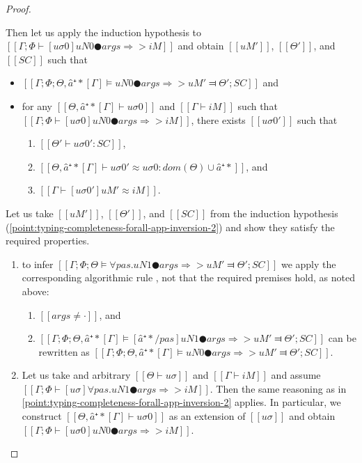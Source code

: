 \begin{proof}
\begin{caseof}
\begin{enumerate}
\begin{enumerate}
                            Then let us apply the induction hypothesis
                            to $[[Γ; Φ ⊢ [uσ0]uN0 ● args ⇒> iM]]$ and obtain 
                            $[[uM']]$, $[[Θ']]$, and $[[SC]]$ such that
                            \begin{itemize}
                                \item $[[ Γ; Φ; Θ, â⁺*[Γ] ⊨ uN0 ● args ⇒> uM' ⫤ Θ'; SC ]]$ and
                                \item \label{point:typing-completeness-forall-app-inversion-3}
                                for any $[[Θ, â⁺*[Γ]  ⊢ uσ0]]$ and $[[Γ ⊢ iM]]$
                                    such that $[[Γ; Φ ⊢ [uσ0]uN0 ● args ⇒> iM]]$, 
                                    there exists $[[uσ0']]$ such that 
                                \begin{enumerate}
                                    \item $[[Θ' ⊢ uσ0' : SC]]$,
                                    \item $[[Θ, â⁺*[Γ] ⊢ uσ0' ≈ uσ0 : dom(Θ) ∪ {â⁺*}]]$, and 
                                    \item $[[Γ ⊢ [uσ0']uM' ≈ iM]]$.
                                \end{enumerate}
                            \end{itemize}
                    \end{enumerate}
            \end{enumerate}
            Let us take $[[uM']]$, $[[Θ']]$, and $[[SC]]$ from the induction hypothesis
            (\ref{point:typing-completeness-forall-app-inversion-2}) and show they 
            satisfy the required properties.
            \begin{enumerate}
                \item to infer $[[ Γ; Φ; Θ ⊨ ∀pas.uN1 ● args ⇒> uM' ⫤ Θ'; SC ]]$
                    we apply the corresponding algorithmic rule ,
                    not that the required premises hold, as noted above:
                    \begin{enumerate}
                        \item $[[args ≠ ·]]$, and 
                        \item $[[Γ; Φ; Θ, â⁺*[Γ] ⊨ [â⁺*/pas]uN1 ● args ⇒> uM' ⫤ Θ'; SC]]$
                            can be rewritten as 
                            $[[ Γ; Φ; Θ, â⁺*[Γ] ⊨ uN0 ● args ⇒> uM' ⫤ Θ'; SC ]]$.
                    \end{enumerate}
                \item Let us take and arbitrary $[[Θ ⊢ uσ]]$ and $[[Γ ⊢ iM]]$
                    and assume $[[Γ; Φ ⊢ [uσ]∀pas.uN1  ● args ⇒> iM]]$. 
                    Then the same reasoning as in 
                    \ref{point:typing-completeness-forall-app-inversion-2}
                    applies. In particular, we construct 
                    $[[Θ, â⁺*[Γ] ⊢ uσ0]]$ as an extension of $[[uσ]]$
                    and obtain 
                    $[[Γ; Φ ⊢ [uσ0]uN0 ● args ⇒> iM]]$.


\end{enumerate}
\end{caseof}
\end{proof}
